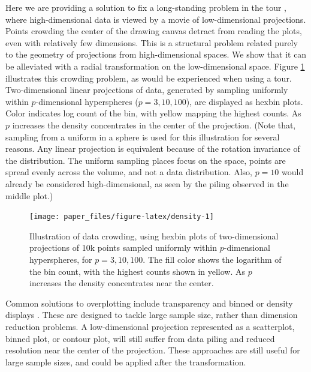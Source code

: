 \documentclass[]{interact}
\theoremstyle{plain}%
\theoremstyle{definition}
\theoremstyle{remark}
\begin{document}
Here we are providing a solution to fix a long-standing problem in the
tour \citep{As85, BCAH05}, where high-dimensional data is viewed by a
movie of low-dimensional projections. Points crowding the center of the
drawing canvas detract from reading the plots, even with relatively few
dimensions. This is a structural problem related purely to the geometry
of projections from high-dimensional spaces. We show that it can be
alleviated with a radial transformation on the low-dimensional space.
Figure \ref{fig:density} illustrates this crowding problem, as would be
experienced when using a tour. Two-dimensional linear projections of
data, generated by sampling uniformly within \(p\)-dimensional
hyperspheres (\(p=3, 10, 100\)), are displayed as hexbin plots. Color
indicates log count of the bin, with yellow mapping the highest counts.
As \(p\) increases the density concentrates in the center of the
projection. (Note that, sampling from a uniform in a sphere is used for
this illustration for several reasons. Any linear projection is
equivalent because of the rotation invariance of the distribution. The
uniform sampling places focus on the space, points are spread evenly
across the volume, and not a data distribution. Also, \(p=10\) would
already be considered high-dimensional, as seen by the piling observed
in the middle plot.)

\begin{figure}

{\centering \texttt{[image: paper\_files/figure-latex/density-1]} 

}

\caption{Illustration of data crowding, using hexbin plots of two-dimensional projections of 10k points sampled uniformly within $p$-dimensional hyperspheres, for $p=3, 10, 100$. The fill color shows the logarithm of the bin count, with the highest counts shown in yellow. As $p$ increases the density  concentrates near the center.}\label{fig:density}
\end{figure}

Common solutions to overplotting include transparency and binned or
density displays \citep{chang}. These are designed to tackle large
sample size, rather than dimension reduction problems. A low-dimensional
projection represented as a scatterplot, binned plot, or contour plot,
will still suffer from data piling and reduced resolution near the
center of the projection. These approaches are still useful for large
sample sizes, and could be applied after the transformation.
\end{document}

